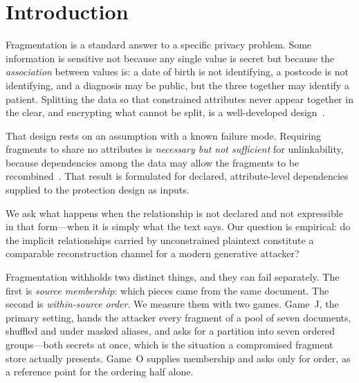 \documentclass[sigconf,review]{acmart}
\begin{document}

\maketitle

\section{Introduction}
\label{sec:intro}

Fragmentation is a standard answer to a specific privacy problem. Some
information is sensitive not because any single value is secret but because the
\emph{association} between values is: a date of birth is not identifying, a
postcode is not identifying, and a diagnosis may be public, but the three
together may identify a patient. Splitting the data so that constrained
attributes never appear together in the clear, and encrypting what cannot be
split, is a well-developed design~\cite{ciriani2010}.

That design rests on an assumption with a known failure mode. Requiring
fragments to share no attributes is \emph{necessary but not sufficient} for
unlinkability, because dependencies among the data may allow the fragments to
be recombined~\cite{decapitani2014}. That result is formulated for declared,
attribute-level dependencies supplied to the protection design as inputs.

We ask what happens when the relationship is not declared and not expressible
in that form---when it is simply what the text says. Our question is empirical:
do the implicit relationships carried by unconstrained plaintext constitute a
comparable reconstruction channel for a modern generative attacker?

Fragmentation withholds two distinct things, and they can fail separately. The
first is \emph{source membership}: which pieces came from the same document.
The second is \emph{within-source order}. We measure them with two games.
Game~J, the primary setting, hands the attacker every fragment of a pool of
seven documents, shuffled and under masked aliases, and asks for a partition
into seven ordered groups---both secrets at once, which is the situation a
compromised fragment store actually presents. Game~O supplies membership and
asks only for order, as a reference point for the ordering half alone.
\end{document}
